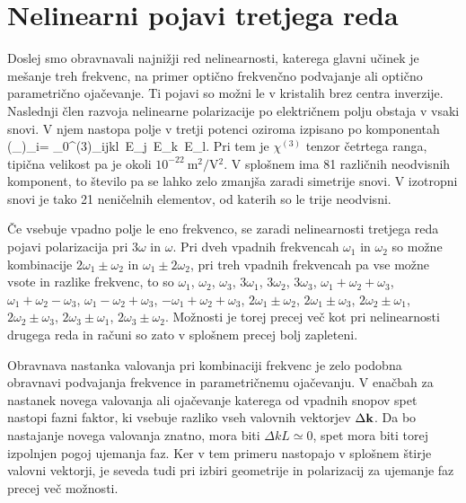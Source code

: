 \section{Nelinearni pojavi tretjega reda}
Doslej smo obravnavali najnižji red nelinearnosti, katerega glavni
učinek je mešanje treh frekvenc, na primer optično frekvenčno podvajanje ali
optično parametrično ojačevanje. Ti pojavi so možni le v kristalih brez centra
inverzije. Naslednji člen razvoja nelinearne polarizacije po električnem
polju obstaja v vsaki snovi. V njem nastopa polje v tretji potenci
oziroma izpisano po komponentah
\beq
\left(_{}\right)_i= \epsilon_{0}\chi^{(3)}_{ijkl} \,E_j \,E_k\, E_l.
\eeq
Pri tem je $\chi^{(3)}$ tenzor četrtega ranga, tipična velikost pa je okoli 
$10^{-22}~\si{\metre^2/\volt^2}$. V splošnem ima 81 različnih neodvisnih komponent, to
število pa se lahko zelo zmanjša zaradi simetrije snovi. V izotropni snovi je tako
21 neničelnih elementov, od katerih so le trije neodvisni. 

Če vsebuje vpadno polje le eno frekvenco, se zaradi nelinearnosti tretjega
reda pojavi polarizacija pri 3$\omega$ in $\omega$. Pri dveh vpadnih
frekvencah $\omega_{1}$ in $\omega_{2}$ so možne kombinacije $2\omega_{1}\pm\omega_{2}$
in $\omega_{1}\pm2\omega_{2}$, pri treh vpadnih frekvencah pa vse
možne vsote in razlike frekvenc, to so $\omega_1$, $\omega_2$, $\omega_3$, 
$3\omega_1$, $3 \omega_2$, $3\omega_3$, 
$\omega_1 + \omega_2 + \omega_3$, $\omega_1 + \omega_2 - \omega_3$, 
$\omega_1 - \omega_2 + \omega_3$, $- \omega_1 + \omega_2 + \omega_3$, 
$2 \omega_1\pm\omega_2$, $2 \omega_1\pm\omega_3$, $2 \omega_2\pm\omega_1$,
$2 \omega_2\pm\omega_3$, $2 \omega_3\pm\omega_1$, $2 \omega_3\pm\omega_2$.
Možnosti je torej precej več kot pri nelinearnosti drugega reda in računi so zato 
v splošnem precej bolj zapleteni.

Obravnava nastanka valovanja pri
kombinaciji frekvenc je zelo podobna obravnavi podvajanja frekvence in parametričnemu
ojačevanju. V enačbah za nastanek novega valovanja ali ojačevanje
katerega od vpadnih snopov spet nastopi fazni faktor, ki vsebuje razliko
vseh valovnih vektorjev $\Delta{\bf k}$. Da bo nastajanje novega
valovanja znatno, mora biti $\Delta kL\simeq0$, spet mora biti torej
izpolnjen pogoj ujemanja faz. Ker v tem primeru nastopajo v splošnem štirje
valovni vektorji, je seveda tudi pri izbiri geometrije in polarizacij
za ujemanje faz precej več možnosti.

